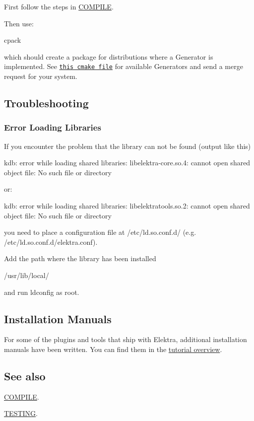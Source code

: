 First follow the steps in \hyperlink{doc_COMPILE_md}{C\+O\+M\+P\+I\+LE}.

Then use\+: \begin{DoxyVerb}cpack
\end{DoxyVerb}


which should create a package for distributions where a Generator is implemented. See \href{/home/markus/Projekte/Elektra/current/cmake/ElektraPackaging.cmake}{\tt this cmake file} for available Generators and send a merge request for your system.

\subsection*{Troubleshooting}

\subsubsection*{Error Loading Libraries}

If you encounter the problem that the library can not be found (output like this) \begin{DoxyVerb}kdb: error while loading shared libraries:
     libelektra-core.so.4: cannot open shared object file: No such file or directory
\end{DoxyVerb}


or\+: \begin{DoxyVerb}kdb: error while loading shared libraries:
     libelektratools.so.2: cannot open shared object file: No such file or directory
\end{DoxyVerb}


you need to place a configuration file at {\ttfamily /etc/ld.so.\+conf.\+d/} (e.\+g. {\ttfamily /etc/ld.so.\+conf.\+d/elektra.conf}).

Add the path where the library has been installed \begin{DoxyVerb}/usr/lib/local/
\end{DoxyVerb}


and run {\ttfamily ldconfig} as root.

\subsection*{Installation Manuals}

For some of the plugins and tools that ship with Elektra, additional installation manuals have been written. You can find them in the \hyperlink{md_doc_tutorials_README_doc_tutorials_README_md}{tutorial overview}.

\subsection*{See also}


\begin{DoxyItemize}
\item \hyperlink{doc_COMPILE_md}{C\+O\+M\+P\+I\+LE}.
\item \hyperlink{doc_TESTING_md}{T\+E\+S\+T\+I\+NG}. 
\end{DoxyItemize}